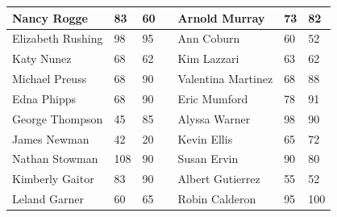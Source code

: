 \documentclass[xcolor=dvipsnames]{beamer}
\begin{document}
\begin{frame}
  \begin{footnotesize}
\begin{tabular}{|l|l|l|l|l|l|l|}
\hline
Nancy Rogge & 83 & 60 & & Arnold Murray & 73 & 82 \\
\hline
Elizabeth Rushing & 98 & 95 & & Ann Coburn & 60 & 52 \\
\hline
Katy Nunez & 68 & 62 & & Kim Lazzari & 63 & 62 \\
\hline
Michael Preuss & 68 & 90 & & Valentina Martinez & 68 & 88 \\
\hline
Edna Phipps & 68 & 90 & & Eric Mumford & 78 & 91 \\
\hline
George Thompson & 45 & 85 & & Alyssa Warner & 98 & 90 \\
\hline
James Newman & 42 & 20 & & Kevin Ellis & 65 & 72 \\
\hline
Nathan Stowman & 108 & 90 & & Susan Ervin & 90 & 80 \\
\hline
Kimberly Gaitor & 83 & 90 & & Albert Gutierrez & 55 & 52 \\
\hline
Leland Garner & 60 & 65 & & Robin Calderon & 95 & 100 \\

\end{tabular}
\end{footnotesize}
\end{frame}
\end{document}
